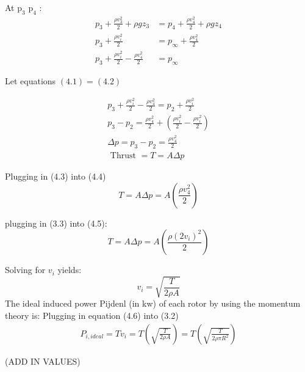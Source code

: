 At $\mathrm{p}_{3}$  $\mathrm{p}_{4}$ :
\begin{align}
p_{3}+\frac{\rho v_{3}^{2}}{2}+\rho g z_{3} &=p_{4}+\frac{\rho v_{4}^{2}}{2}+\rho g z_{4} \\
p_{3}+\frac{\rho v_{i}^{2}}{2} &=p_{\infty}+\frac{\rho v_{4}^{2}}{2} \\
p_{3}+\frac{\rho v_{i}^{2}}{2}-\frac{\rho v_{4}^{2}}{2}&=p_{\infty}
\end{align}

Let equations $(4.1)=(4.2)$

\begin{align}
p_{3}+\frac{\rho v_{i}^{2}}{2}-\frac{\rho v_{4}^{2}}{2}=p_{2}+\frac{\rho v_{i}^{2}}{2} \\
p_{3}-p_{2}=\frac{\rho v_{4}^{2}}{2}+\left(\frac{\rho v_{i}^{2}}{2}-\frac{\rho v_{i}^{2}}{2}\right) \\
\Delta p=p_{3}-p_{2}=\frac{\rho v_{4}^{2}}{2} \\
\text { Thrust }=T=A \Delta p
\end{align}

Plugging in (4.3) into (4.4)
\begin{equation}
T=A \Delta p=A\left(\frac{\rho v_{4}^{2}}{2}\right)
\end{equation}


plugging in (3.3) into (4.5):
\begin{equation}
T=A \Delta p=A\left(\frac{\rho\left(2 v_{i}\right)^{2}}{2}\right)
\end{equation}

Solving for $v_i$ yields:
\begin{equation}
v_{i}=\sqrt{\frac{T}{2 \rho A}}
\end{equation}
The ideal induced power Pijdenl (in kw) of each rotor by using the momentum theory is:
Plugging in equation (4.6) into (3.2) \\
\begin{align}
P_{i, ideal}= Tv_i = T\left(\sqrt{\frac{T}{2 \rho A}}\right) = T\left(\sqrt{\frac{T}{2 \rho \pi R^2}}\right)
\end{align}




(ADD IN VALUES)










